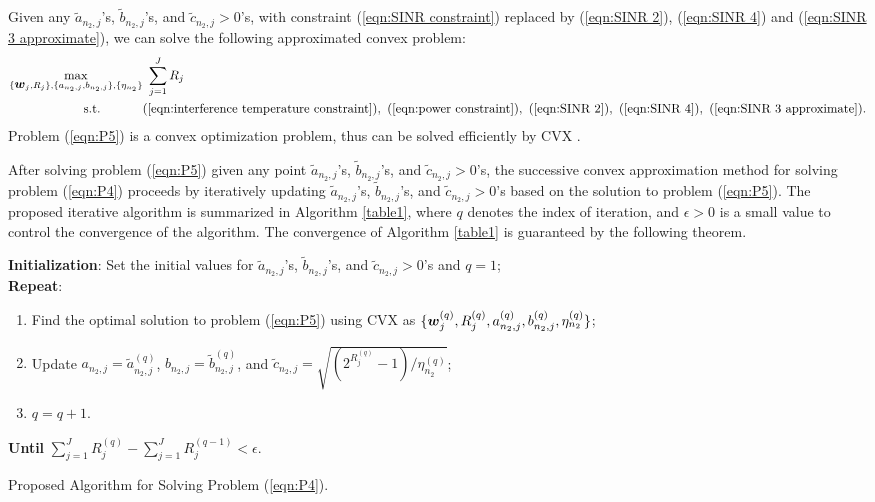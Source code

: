 \documentclass[onecolumn, draftclsnofoot, 12pt]{IEEEtran}
\newcommand{\mv}[1]{\mbox{\boldmath{$ #1 $}}}
\begin{document}
Given any $\tilde{a}_{n_2,j}$'s, $\tilde{b}_{n_2,j}$'s, and $\tilde{c}_{n_2,j}>0$'s, with constraint (\ref{eqn:SINR constraint}) replaced by (\ref{eqn:SINR 2}), (\ref{eqn:SINR 4}) and (\ref{eqn:SINR 3 approximate}), we can solve the following approximated convex problem:
\begin{subequations}\label{eqn:P5}\begin{align}
\mathop{\underset{\{\mv{w}_j,R_j\},\{a_{n_2,j},b_{n_2,j}\},\{\eta_{n_2}\}}{\max}} & ~ \sum\limits_{j=1}^J R_j  \\
\mathrm{s.t.} \ \ \ \ \ \ \ \ \ \ & ({\rm \ref{eqn:interference temperature constraint}}), ~ ({\rm \ref{eqn:power constraint}}), ~ (\ref{eqn:SINR 2}), ~ (\ref{eqn:SINR 4}), ~ (\ref{eqn:SINR 3 approximate}).
\end{align}\end{subequations}
Problem (\ref{eqn:P5}) is a convex optimization problem, thus can be solved efficiently by CVX \cite{CVX}.



After solving problem (\ref{eqn:P5}) given any point $\tilde{a}_{n_2,j}$'s, $\tilde{b}_{n_2,j}$'s, and $\tilde{c}_{n_2,j}>0$'s, the successive convex approximation method for solving problem (\ref{eqn:P4}) proceeds by iteratively updating $\tilde{a}_{n_2,j}$'s, $\tilde{b}_{n_2,j}$'s, and $\tilde{c}_{n_2,j}>0$'s based on the solution to problem (\ref{eqn:P5}). The proposed iterative algorithm is summarized in Algorithm \ref{table1}, where $q$ denotes the index of iteration, and $\epsilon>0$ is a small value to control the convergence of the algorithm. The convergence of Algorithm \ref{table1} is guaranteed by the following theorem.

\begin{algorithm}[t]
{\bf Initialization}: Set the initial values for $\tilde{a}_{n_2,j}$'s, $\tilde{b}_{n_2,j}$'s, and $\tilde{c}_{n_2,j}>0$'s and $q=1$; \\
{\bf Repeat}:
\begin{enumerate}
\item Find the optimal solution to problem (\ref{eqn:P5}) using CVX as $\{\mv{w}_j^{(q)},R_j^{(q)},a_{n_2,j}^{(q)},b_{n_2,j}^{(q)},\eta_{n_2}^{(q)}\}$;
\item Update $a_{n_2,j}=\tilde{a}_{n_2,j}^{(q)}$, $b_{n_2,j}=\tilde{b}_{n_2,j}^{(q)}$, and $\tilde{c}_{n_2,j}=\sqrt{(2^{R_j^{(q)}}-1)/\eta_{n_2}^{(q)}}$;
\item $q=q+1$.
\end{enumerate}
{\bf Until} $\sum_{j=1}^J R_j^{(q)}-\sum_{j=1}^J R_j^{(q-1)}<\epsilon$.
\caption{Proposed Algorithm for Solving Problem (\ref{eqn:P4}).}
\label{table1}
\end{algorithm}
\end{document}
